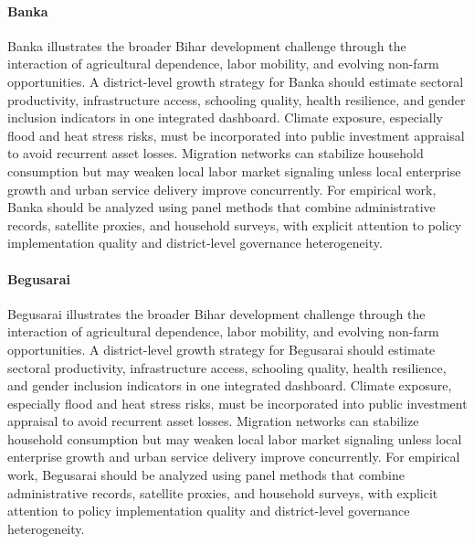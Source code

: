 \documentclass[preprint,12pt]{elsarticle}
\begin{document}
\paragraph{Banka} Banka illustrates the broader Bihar development challenge through the interaction of agricultural dependence, labor mobility, and evolving non-farm opportunities. A district-level growth strategy for Banka should estimate sectoral productivity, infrastructure access, schooling quality, health resilience, and gender inclusion indicators in one integrated dashboard. Climate exposure, especially flood and heat stress risks, must be incorporated into public investment appraisal to avoid recurrent asset losses. Migration networks can stabilize household consumption but may weaken local labor market signaling unless local enterprise growth and urban service delivery improve concurrently. For empirical work, Banka should be analyzed using panel methods that combine administrative records, satellite proxies, and household surveys, with explicit attention to policy implementation quality and district-level governance heterogeneity.

\paragraph{Begusarai} Begusarai illustrates the broader Bihar development challenge through the interaction of agricultural dependence, labor mobility, and evolving non-farm opportunities. A district-level growth strategy for Begusarai should estimate sectoral productivity, infrastructure access, schooling quality, health resilience, and gender inclusion indicators in one integrated dashboard. Climate exposure, especially flood and heat stress risks, must be incorporated into public investment appraisal to avoid recurrent asset losses. Migration networks can stabilize household consumption but may weaken local labor market signaling unless local enterprise growth and urban service delivery improve concurrently. For empirical work, Begusarai should be analyzed using panel methods that combine administrative records, satellite proxies, and household surveys, with explicit attention to policy implementation quality and district-level governance heterogeneity.
\end{document}
